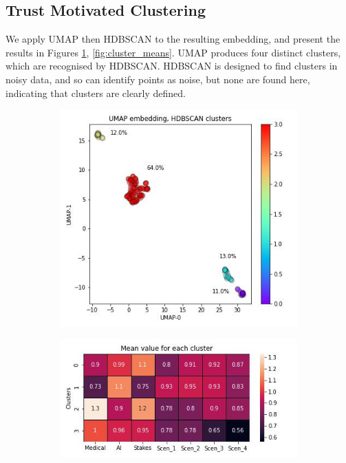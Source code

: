 \documentclass[manuscript,screen,review]{acmart}
\begin{document}
\subsection{Trust Motivated Clustering}



We apply UMAP then HDBSCAN to the resulting embedding, and present the results in Figures \ref{fig:embedding}, \ref{fig:cluster_means}. UMAP produces four distinct clusters, which are recognised by HDBSCAN. HDBSCAN is designed to find clusters in noisy data, and so can identify points as noise, but none are found here, indicating that clusters are clearly defined.

\begin{figure}
\centering
\begin{subfigure}{0.5\textwidth}
  \centering
  \includegraphics[width=\linewidth]{graphics/UMAP_HDBSCAN.jpg}
  \caption{}
  \label{fig:embedding}
\end{subfigure}%
\begin{subfigure}{0.55\textwidth}
  \centering
  \includegraphics[width=\linewidth]{graphics/clustering_means.jpg}

\end{subfigure}
\end{figure}
\end{document}
